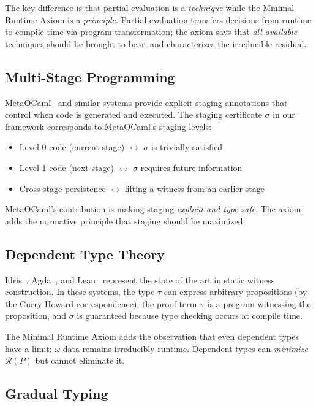 \documentclass[11pt]{article}
\newcommand{\RP}{\mathcal{R}(P)}
\newcommand{\omegadata}{\omega\text{-data}}
\begin{document}
The key difference is that partial evaluation is a \emph{technique} while the Minimal
Runtime Axiom is a \emph{principle}. Partial evaluation transfers decisions from runtime
to compile time via program transformation; the axiom says that \emph{all available}
techniques should be brought to bear, and characterizes the irreducible residual.

\subsection{Multi-Stage Programming}

MetaOCaml~\cite{kiselyov2014metaocaml} and similar systems provide explicit staging
annotations that control when code is generated and executed. The staging certificate
$\sigma$ in our framework corresponds to MetaOCaml's staging levels:

\begin{itemize}[nosep]
  \item Level 0 code (current stage) $\leftrightarrow$ $\sigma$ is trivially satisfied
  \item Level 1 code (next stage) $\leftrightarrow$ $\sigma$ requires future information
  \item Cross-stage persistence $\leftrightarrow$ lifting a witness from an earlier stage
\end{itemize}

MetaOCaml's contribution is making staging \emph{explicit and type-safe}. The axiom
adds the normative principle that staging should be maximized.

\subsection{Dependent Type Theory}

Idris~\cite{brady2013idris}, Agda~\cite{norell2009agda}, and Lean~\cite{demoura2015lean}
represent the state of the art in static witness construction. In these systems, the
type $\tau$ can express arbitrary propositions (by the Curry-Howard correspondence), the
proof term $\pi$ is a program witnessing the proposition, and $\sigma$ is guaranteed
because type checking occurs at compile time.

The Minimal Runtime Axiom adds the observation that even dependent types have a limit:
$\omegadata$ remains irreducibly runtime. Dependent types can \emph{minimize} $\RP$
but cannot eliminate it.

\subsection{Gradual Typing}
\end{document}
